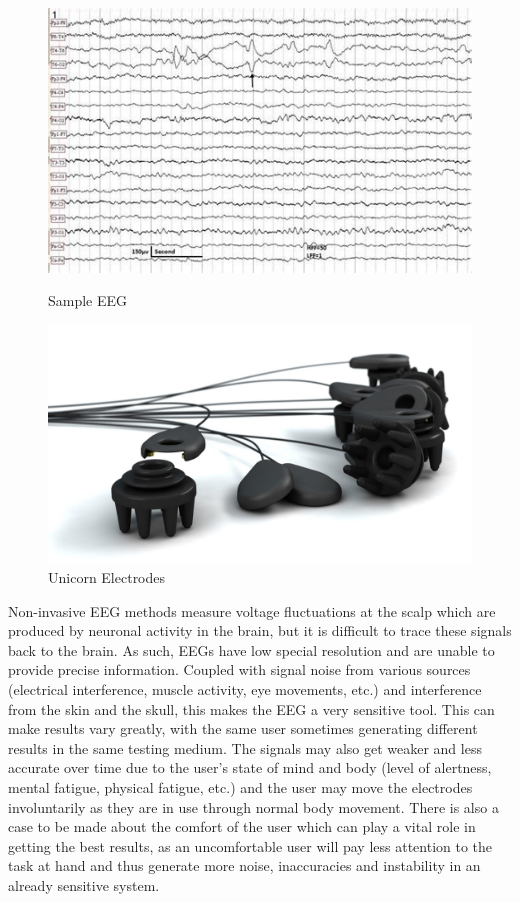 \begin{figure}[H]
    \begin{minipage}[c]{0.45\linewidth}
      \includegraphics[width=\linewidth]{Graphics/EEG Example.jpeg}
      \caption{Sample EEG}
      \label{fig:sample eeg}
      \end{minipage}
    \hfill
    \begin{minipage}[c]{0.45\linewidth}
      \includegraphics[width=\linewidth]{Graphics/Unicorn Electrodes.jpg}
      \caption{Unicorn Electrodes}
      \label{fig:unicorn electrodes}
  \end{minipage}%
\end{figure}

Non-invasive EEG methods measure voltage fluctuations at the scalp which are produced by neuronal activity in the brain, but it is difficult to trace these signals back to the brain. As such, EEGs have low special resolution and are unable to provide precise information. Coupled with signal noise from various sources (electrical interference, muscle activity, eye movements, etc.) and interference from the skin and the skull, this makes the EEG a very sensitive tool. This can make results vary greatly, with the same user sometimes generating different results in the same testing medium. The signals may also get weaker and less accurate over time due to the user's state of mind and body (level of alertness, mental fatigue, physical fatigue, etc.) and the user may move the electrodes involuntarily as they are in use through normal body movement. There is also a case to be made about the comfort of the user which can play a vital role in getting the best results, as an uncomfortable user will pay less attention to the task at hand and thus generate more noise, inaccuracies and instability in an already sensitive system.


